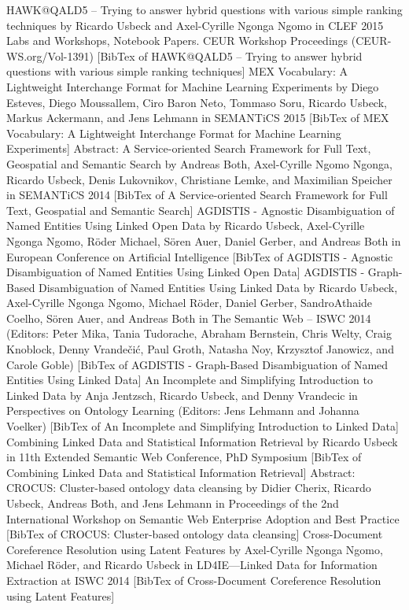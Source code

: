 HAWK@QALD5 -- Trying to answer hybrid questions with various simple ranking techniques by Ricardo Usbeck and Axel-Cyrille Ngonga Ngomo in CLEF 2015 Labs and Workshops, Notebook Papers. CEUR Workshop Proceedings (CEUR-WS.org/Vol-1391) [BibTex of HAWK@QALD5 -- Trying to answer hybrid questions with various simple ranking techniques]
MEX Vocabulary: A Lightweight Interchange Format for Machine Learning Experiments by Diego Esteves, Diego Moussallem, Ciro Baron Neto, Tommaso Soru, Ricardo Usbeck, Markus Ackermann, and Jens Lehmann in SEMANTiCS 2015 [BibTex of MEX Vocabulary: A Lightweight Interchange Format for Machine Learning Experiments] 
Abstract:
A Service-oriented Search Framework for Full Text, Geospatial and Semantic Search by Andreas Both, Axel-Cyrille Ngomo Ngonga, Ricardo Usbeck, Denis Lukovnikov, Christiane Lemke, and Maximilian Speicher in SEMANTiCS 2014 [BibTex of A Service-oriented Search Framework for Full Text, Geospatial and Semantic Search]
AGDISTIS - Agnostic Disambiguation of Named Entities Using Linked Open Data by Ricardo Usbeck, Axel-Cyrille Ngonga Ngomo, Röder Michael, Sören Auer, Daniel Gerber, and Andreas Both in European Conference on Artificial Intelligence [BibTex of AGDISTIS - Agnostic Disambiguation of Named Entities Using Linked Open Data]
AGDISTIS - Graph-Based Disambiguation of Named Entities Using Linked Data by Ricardo Usbeck, Axel-Cyrille Ngonga Ngomo, Michael Röder, Daniel Gerber, SandroAthaide Coelho, Sören Auer, and Andreas Both in The Semantic Web -- ISWC 2014 (Editors: Peter Mika, Tania Tudorache, Abraham Bernstein, Chris Welty, Craig Knoblock, Denny Vrandečić, Paul Groth, Natasha Noy, Krzysztof Janowicz, and Carole Goble) [BibTex of AGDISTIS - Graph-Based Disambiguation of Named Entities Using Linked Data]
An Incomplete and Simplifying Introduction to Linked Data by Anja Jentzsch, Ricardo Usbeck, and Denny Vrandecic in Perspectives on Ontology Learning (Editors: Jens Lehmann and Johanna Voelker) [BibTex of An Incomplete and Simplifying Introduction to Linked Data]
Combining Linked Data and Statistical Information Retrieval by Ricardo Usbeck in 11th Extended Semantic Web Conference, PhD Symposium [BibTex of Combining Linked Data and Statistical Information Retrieval] 
Abstract:
CROCUS: Cluster-based ontology data cleansing by Didier Cherix, Ricardo Usbeck, Andreas Both, and Jens Lehmann in Proceedings of the 2nd International Workshop on Semantic Web Enterprise Adoption and Best Practice [BibTex of CROCUS: Cluster-based ontology data cleansing]
Cross-Document Coreference Resolution using Latent Features by Axel-Cyrille Ngonga Ngomo, Michael Röder, and Ricardo Usbeck in LD4IE---Linked Data for Information Extraction at ISWC 2014 [BibTex of Cross-Document Coreference Resolution using Latent Features]
